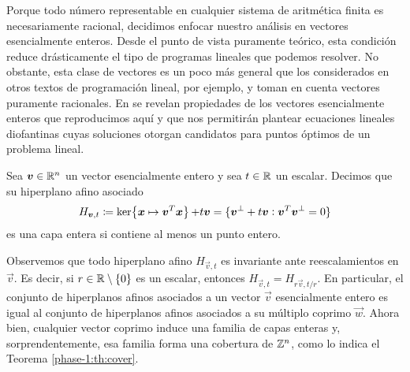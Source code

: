 Porque todo número representable en cualquier sistema de aritmética finita es necesariamente
racional, decidimos enfocar nuestro análisis en vectores esencialmente enteros. Desde el punto de
vista puramente teórico, esta condición reduce drásticamente el tipo de programas lineales que
podemos resolver. No obstante, esta clase de vectores es un poco más general que los considerados en
otros textos de programación lineal, por ejemplo, \cite{martello} y \cite{alex} toman en cuenta
vectores puramente racionales. En \cite{herr} se revelan propiedades de los vectores esencialmente
enteros que reproducimos aquí y que nos permitirán plantear ecuaciones lineales diofantinas cuyas
soluciones otorgan candidatos para puntos óptimos de un problema lineal.

\begin{definition}
	\label{phase-1:def:c-layer}
	Sea $\boldsymbol{v} \in \mathbb{R}^n$ un vector esencialmente entero y sea $t \in \mathbb{R}$ un escalar. Decimos que
	su hiperplano afino asociado
	\begin{equation}
		\label{phase-1:def:affine-hyperplane}
		H_{\vec{v}, t} \coloneq \ker{\vec{x} \mapsto \vec{v}^T\vec{x}} + t\vec{v}
		= \lbrace \vec{v}^{\perp} + t\vec{v} \vcentcolon \vec{v}^T\vec{v}^{\perp} = 0 \rbrace
	\end{equation}
	es una capa entera si contiene al menos un punto entero.
\end{definition}
Observemos que todo hiperplano afino $H_{\vec{v}, t}$ es invariante ante reescalamientos en
$\vec{v}$. Es decir, si $r \in \mathbb{R} \setminus \lbrace 0 \rbrace$ es un escalar, entonces $H_{\vec{v},
t} = H_{r\vec{v}, t/r}$. En particular, el conjunto de hiperplanos afinos asociados a un vector
$\vec{v}$ esencialmente entero es igual al conjunto de hiperplanos afinos asociados a su múltiplo
coprimo $\vec{w}$. Ahora bien, cualquier vector coprimo induce una familia de capas enteras y,
sorprendentemente, esa familia forma una cobertura de $\mathbb{Z}^n$, como lo indica el Teorema
\ref{phase-1:th:cover}.

